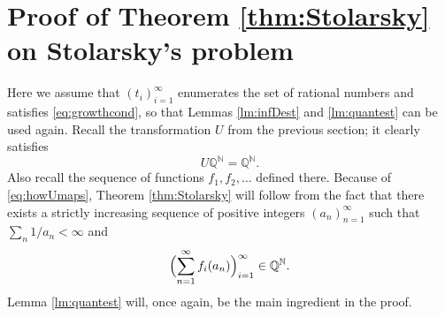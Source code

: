 \documentclass[11pt,letterpaper,reqno]{amsart}
\numberwithin{equation}{section}
\theoremstyle{definition}
\numberwithin{equation}{section}
\begin{document}

\section{Proof of Theorem \ref{thm:Stolarsky} on Stolarsky's problem}
\label{sec:proofStolarsky}

Here we assume that $(t_i)_{i=1}^{\infty}$ enumerates the set of rational numbers and satisfies \eqref{eq:growthcond}, so that Lemmas \ref{lm:infDest} and \ref{lm:quantest} can be used again.
Recall the transformation $U$ from the previous section; it clearly satisfies
\[ U \mathbb{Q}^{\mathbb{N}} = \mathbb{Q}^{\mathbb{N}} . \]
Also recall the sequence of functions $f_1,f_2,\ldots$ defined there. Because of \eqref{eq:howUmaps}, Theorem \ref{thm:Stolarsky} will follow from the fact that there exists a strictly increasing sequence of positive integers $(a_n)_{n=1}^{\infty}$ such that $\sum_n 1/a_n < \infty$ and
\[ \Bigl( \sum_{n=1}^{\infty} f_i(a_n) \Bigr)_{i=1}^{\infty} \in \mathbb{Q}^{\mathbb{N}}. \]
Lemma \ref{lm:quantest} will, once again, be the main ingredient in the proof.
\end{document}
